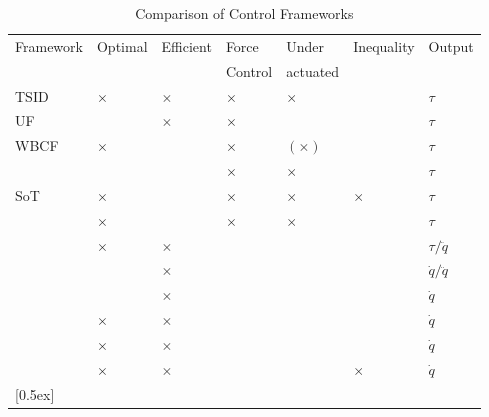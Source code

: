 \begin{table}[bh] 
\caption{Comparison of Control Frameworks\cite{DelPrete2014c}}
\centering 
\begin{tabular}{|p{3.5cm} | p{1.2cm} p{1.2cm} p{1.2cm} p{1.2cm} p{1.4cm} p{1.1cm}|}
\hline 
	Framework		& Optimal & Efficient & Force& Under & Inequality & Output \\ 
 	& & & Control & actuated& &  \\ \rowcolor[gray]{.9}   
\hline 
	TSID\cite{DelPrete2014c}& $\times$ & $\times$ & $\times$ & $\times$ & & $\tau$ \\
	UF\cite{Peters2007}		&  & $\times$ & $\times$ &  & & $\tau$ \\  \rowcolor[gray]{.9}
	WBCF\cite{Sentis2005}	& $\times$ &  & $\times$ & $(\times)$ &  & $\tau$\\ 
	\cite{Mistry2011}		&  & & $\times$ & $\times$ & & $\tau$ \\ \rowcolor[gray]{.9}
	SoT\cite{Saab2011}		& $\times$ &  & $\times$ & $\times$ & $\times$& $\tau$ \\  
	\cite{DeLasa2009}		& $\times$ & &$\times$& $\times$ &  & $\tau$ \\  \rowcolor[gray]{.9}
	\cite{Jeong2009}		& $\times$ & $\times$ &  &  & & $\tau/\ddot{q}$ \\      
	\cite{nakamura1987task}		& & $\times$ &  &  & & $\dot{q}/\ddot{q}$ \\ \rowcolor[gray]{.9}
    	\cite{Chiaverini1997}		& & $\times$ &  &  & & $\dot{q}$ \\ 
	\cite{siciliano1991general}	& $\times$ & $\times$ &  &  & & $\dot{q}$ \\  \rowcolor[gray]{.9}

	\cite{Baerlocher1998}		& $\times$ & $\times$ &  &  & & $\dot{q}$ \\  
	\cite{Smits2008}		& $\times$ & $\times$ &  &  & $\times$& $\dot{q}$ \\   \rowcolor[gray]{.9}        
[0.5ex] \hline 
\end{tabular} 
\label{table:simu_params} %
\end{table}

